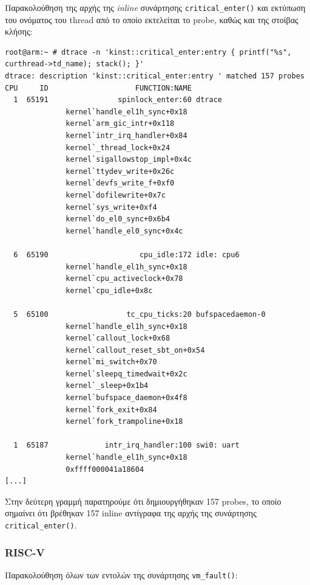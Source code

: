 \documentclass[12pt]{article}
\begin{document}
Παρακολούθηση της αρχής της \textit{inline} συνάρτησης
\lstinline{critical_enter()} και εκτύπωση του ονόματος του thread από το οποίο
εκτελείται το probe, καθώς και της στοίβας κλήσης:

\begin{lstlisting}
root@arm:~ # dtrace -n 'kinst::critical_enter:entry { printf("%s", curthread->td_name); stack(); }'
dtrace: description 'kinst::critical_enter:entry ' matched 157 probes
CPU     ID                    FUNCTION:NAME
  1  65191                spinlock_enter:60 dtrace
              kernel`handle_el1h_sync+0x18
              kernel`arm_gic_intr+0x118
              kernel`intr_irq_handler+0x84
              kernel`_thread_lock+0x24
              kernel`sigallowstop_impl+0x4c
              kernel`ttydev_write+0x26c
              kernel`devfs_write_f+0xf0
              kernel`dofilewrite+0x7c
              kernel`sys_write+0xf4
              kernel`do_el0_sync+0x6b4
              kernel`handle_el0_sync+0x4c

  6  65190                     cpu_idle:172 idle: cpu6
              kernel`handle_el1h_sync+0x18
              kernel`cpu_activeclock+0x78
              kernel`cpu_idle+0x8c

  5  65100                  tc_cpu_ticks:20 bufspacedaemon-0
              kernel`handle_el1h_sync+0x18
              kernel`callout_lock+0x68
              kernel`callout_reset_sbt_on+0x54
              kernel`mi_switch+0x70
              kernel`sleepq_timedwait+0x2c
              kernel`_sleep+0x1b4
              kernel`bufspace_daemon+0x4f8
              kernel`fork_exit+0x84
              kernel`fork_trampoline+0x18

  1  65187             intr_irq_handler:100 swi0: uart
              kernel`handle_el1h_sync+0x18
              0xffff000041a18604
[...]
\end{lstlisting}

Στην δεύτερη γραμμή παρατηρούμε ότι δημιουργήθηκαν 157 probes, το οποίο
σημαίνει ότι βρέθηκαν 157 inline αντίγραφα της αρχής της συνάρτησης
\lstinline{critical_enter()}.

\subsubsection{RISC-V}

Παρακολούθηση όλων των εντολών της συνάρτησης \lstinline{vm_fault()}:
\end{document}
